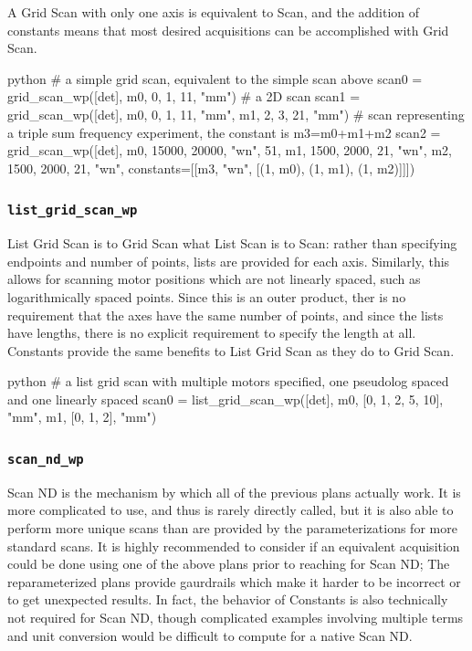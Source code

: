 A Grid Scan with only one axis is equivalent to Scan, and the addition of constants means that most desired acquisitions can be accomplished with Grid Scan.

\begin{codefragment}{python}
# a simple grid scan, equivalent to the simple scan above
scan0 = grid_scan_wp([det], m0, 0, 1, 11, "mm")
# a 2D scan
scan1 = grid_scan_wp([det], m0, 0, 1, 11, "mm", m1, 2, 3, 21, "mm")
# scan representing a triple sum frequency experiment, the constant is m3=m0+m1+m2
scan2 = grid_scan_wp([det], m0, 15000, 20000, "wn", 51, m1, 1500, 2000, 21, "wn", m2, 1500, 2000, 21, "wn", constants=[[m3, "wn", [(1, m0), (1, m1), (1, m2)]]])
\end{codefragment}

\subsubsection{\texttt{list\_grid\_scan\_wp}}

List Grid Scan is to Grid Scan what List Scan is to Scan: rather than specifying endpoints and number of points, lists are provided for each axis.
Similarly, this allows for scanning motor positions which are not linearly spaced, such as logarithmically spaced points.
Since this is an outer product, ther is no requirement that the axes have the same number of points, and since the lists have lengths, there is no explicit requirement to specify the length at all.
Constants provide the same benefits to List Grid Scan as they do to Grid Scan.

\begin{codefragment}{python}
# a list grid scan with multiple motors specified, one pseudolog spaced and one linearly spaced
scan0 = list_grid_scan_wp([det], m0, [0, 1, 2, 5, 10], "mm", m1, [0, 1, 2], "mm")
\end{codefragment}

\subsubsection{\texttt{scan\_nd\_wp}}

Scan ND is the mechanism by which all of the previous plans actually work.
It is more complicated to use, and thus is rarely directly called, but it is also able to perform more unique scans than are provided by the parameterizations for more standard scans.
It is highly recommended to consider if an equivalent acquisition could be done using one of the above plans prior to reaching for Scan ND; The reparameterized plans provide gaurdrails which make it harder to be incorrect or to get unexpected results.
In fact, the behavior of Constants is also technically not required for Scan ND, though complicated examples involving multiple terms and unit conversion would be difficult to compute for a native Scan ND.

